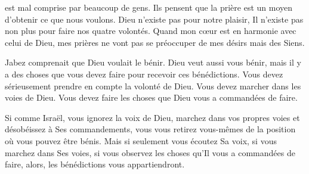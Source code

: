 \dvrule






 est mal comprise par beaucoup de gens.
 Ils pensent que la prière est un moyen d'obtenir ce que nous voulons.
 Dieu n'existe pas pour notre plaisir, Il n'existe pas non plus pour faire
 nos quatre volontés.
 Quand mon c\oe{}ur est en harmonie avec celui de Dieu,
 mes prières ne vont pas se préoccuper de mes désirs mais des Siens. 


Jabez comprenait que Dieu voulait le bénir. Dieu veut aussi vous bénir,
 mais il y a des choses que vous devez faire pour recevoir ces bénédictions.
 Vous devez sérieusement prendre en compte la volonté de Dieu.
 Vous devez marcher dans les voies de Dieu.
 Vous devez faire les choses que Dieu vous a commandées de faire. 

Si comme Israël, vous ignorez la voix de Dieu, marchez dans vos propres voies
 et désobéissez à Ses commandements, vous vous retirez vous-mêmes
 de la position où vous pouvez être bénis. Mais si seulement
 vous écoutez Sa voix, si vous marchez dans Ses voies,
 si vous observez les choses qu'Il vous a commandées de faire, alors,
 les bénédictions vous appartiendront. 

\dvrule



